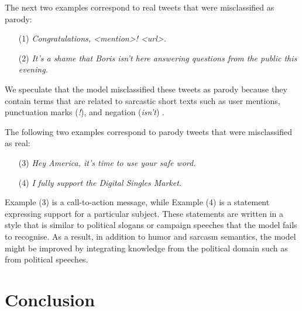 \documentclass[11pt]{article}
\begin{document}
The next two examples correspond to real tweets that were misclassified as parody:
\begin{itemize}
\item [(1)]  \textit{Congratulations, <mention>! <url>.}
\item [(2)] \textit{It's a shame that Boris isn't here answering questions from the public this evening.}
\end{itemize}
We speculate that the model misclassified these tweets as parody because they contain terms that are related to sarcastic short texts such as user mentions, punctuation marks (\textit{!}), and negation (\textit{isn't}) \cite{gonzalez-ibanez-etal-2011-identifying,Parody_Humor}.


The following two examples correspond to parody tweets that were misclassified as real:
\begin{itemize}
\item [(3)] \textit{Hey America, it’s time to use your safe word.}
\item [(4)]\textit{I fully support the Digital Singles Market.}
\end{itemize}

Example (3) is a call-to-action message, while Example (4) is a statement expressing support for a particular subject. These statements are written in a style that is similar to political slogans or campaign speeches \citep{fowler2021political} that the model fails to recognise. As a result, in addition to humor and sarcasm semantics, the model might be improved by integrating knowledge from the political domain such as from political speeches.


\section{Conclusion}
\end{document}
